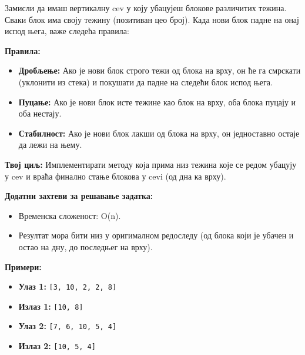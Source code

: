 Замисли да имаш вертикалну cev у коју убацујеш блокове различитих тежина. Сваки блок има своју тежину (позитиван цео број). Када нови блок падне на онај испод њега, важе следећа правила:

\textbf{Правила:}
\begin{itemize}
	\item \textbf{Дробљење:} Ако је нови блок строго тежи од блока на врху, он ће га смрскати (уклонити из стека) и покушати да падне на следећи блок испод њега.
	\item \textbf{Пуцање:} Ако је нови блок исте тежине као блок на врху, оба блока пуцају и оба нестају.
	\item \textbf{Стабилност:} Ако је нови блок лакши од блока на врху, он једноставно остаје да лежи на њему.
\end{itemize}

\textbf{Твој циљ:} Имплементирати методу која прима низ тежина које се редом убацују у cev и враћа финално стање блокова у cevi (од дна ка врху).

\textbf{Додатни захтеви за решавање задатка:}
\begin{itemize}
	\item Временска сложеност: O(n).
	\item Резултат мора бити низ у оригималном редоследу (од блока који је убачен и остао на дну, до последњег на врху).
\end{itemize}

\textbf{Примери:}
\begin{itemize}
	\item \textbf{Улаз 1:} \texttt{[3, 10, 2, 2, 8]}
	\item \textbf{Излаз 1:} \texttt{[10, 8]}
	\item \textbf{Улаз 2:} \texttt{[7, 6, 10, 5, 4]}
	\item \textbf{Излаз 2:} \texttt{[10, 5, 4]}
\end{itemize}

